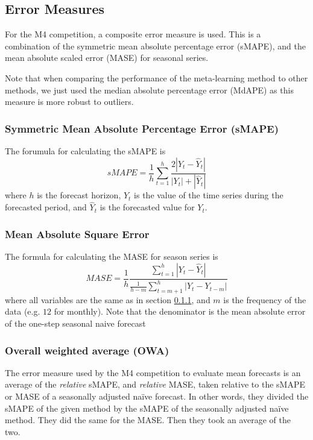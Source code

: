 \documentclass[a4paper,12pt]{article}
\theoremstyle{definition}
\begin{document}
\subsection{Error Measures}
For the M4 competition, a composite error measure is used. This is a combination of the symmetric mean absolute percentage error (sMAPE), and the mean absolute scaled error (MASE) for seasonal series.

Note that when comparing the performance of the meta-learning method to other methods, we just used the median absolute percentage error (MdAPE) as this measure is more robust to outliers.

\subsubsection{Symmetric Mean Absolute Percentage Error (sMAPE)}\label{sec:smape}
The forumula for calculating the sMAPE is
\begin{equation}
	sMAPE = \frac{1}{h}\sum_{t=1}^{h}\frac{2 |Y_t - \hat{Y}_t|}{|Y_t| + |\hat{Y}_t|}
\end{equation}
where $h$ is the forecast horizon, $Y_t$ is the value of the time series during the forecasted period, and $\hat{Y}_t$ is the forecasted value for $Y_t$. 

\subsubsection{Mean Absolute Square Error}
The formula for calculating the MASE for season series is
\begin{equation}
	MASE = \frac{1}{h} \frac{\sum_{t=1}^{h}|Y_t - \hat{Y}_t|}{\frac{1}{h-m}\sum_{t=m+1}^{h}|Y_t - Y_{t-m}|}
\end{equation}
where all variables are the same as in section \ref{sec:smape}, and $m$ is the frequency of the data (e.g. $12$ for monthly). Note that the denominator is the mean absolute error of the one-step seasonal naive forecast

\subsubsection{Overall weighted average (OWA)}
The error measure used by the M4 competition to evaluate mean forecasts is an average of the \textit{relative} sMAPE, and \textit{relative} MASE, taken relative to the sMAPE or MASE of a seasonally adjusted na{\"i}ve forecast. In other words, they divided the sMAPE of the given method by the sMAPE of the seasonally adjusted na{\"i}ve method. They did the same for the MASE. Then they took an average of the two.
\end{document}
